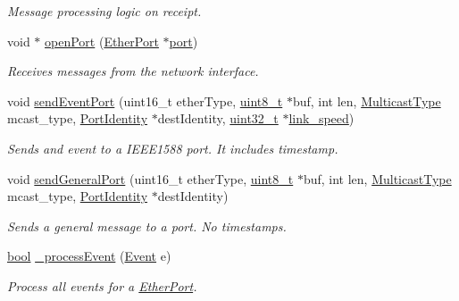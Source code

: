 \begin{DoxyCompactItemize}
\begin{DoxyCompactList}\small\item\em Message processing logic on receipt. \end{DoxyCompactList}\item 
void $\ast$ \hyperlink{class_ether_port_a5d1ebb55c2a94cd0ca8c9750998e2c30}{open\+Port} (\hyperlink{class_ether_port}{Ether\+Port} $\ast$\hyperlink{gst__avb__playbin_8c_a63c89c04d1feae07ca35558055155ffb}{port})
\begin{DoxyCompactList}\small\item\em Receives messages from the network interface. \end{DoxyCompactList}\item 
void \hyperlink{class_ether_port_aea269233243bac1387e416c93eed2184}{send\+Event\+Port} (uint16\+\_\+t ether\+Type, \hyperlink{stdint_8h_aba7bc1797add20fe3efdf37ced1182c5}{uint8\+\_\+t} $\ast$buf, int len, \hyperlink{avbts__message_8hpp_aee4ca524cb617678ed1bd2db2b56da42}{Multicast\+Type} mcast\+\_\+type, \hyperlink{class_port_identity}{Port\+Identity} $\ast$dest\+Identity, \hyperlink{parse_8c_a6eb1e68cc391dd753bc8ce896dbb8315}{uint32\+\_\+t} $\ast$\hyperlink{class_common_port_aae24fc4f200e75aa8215f797b2561dbf}{link\+\_\+speed})
\begin{DoxyCompactList}\small\item\em Sends and event to a I\+E\+E\+E1588 port. It includes timestamp. \end{DoxyCompactList}\item 
void \hyperlink{class_ether_port_a9de15e5c639faaf04407f126e241358a}{send\+General\+Port} (uint16\+\_\+t ether\+Type, \hyperlink{stdint_8h_aba7bc1797add20fe3efdf37ced1182c5}{uint8\+\_\+t} $\ast$buf, int len, \hyperlink{avbts__message_8hpp_aee4ca524cb617678ed1bd2db2b56da42}{Multicast\+Type} mcast\+\_\+type, \hyperlink{class_port_identity}{Port\+Identity} $\ast$dest\+Identity)
\begin{DoxyCompactList}\small\item\em Sends a general message to a port. No timestamps. \end{DoxyCompactList}\item 
\hyperlink{avb__gptp_8h_af6a258d8f3ee5206d682d799316314b1}{bool} \hyperlink{class_ether_port_a2b3fe2386d7d83b77610339ec7c5778d}{\+\_\+process\+Event} (\hyperlink{class_event}{Event} e)
\begin{DoxyCompactList}\small\item\em Process all events for a \hyperlink{class_ether_port}{Ether\+Port}. \end{DoxyCompactList}\item 

\end{DoxyCompactItemize}

